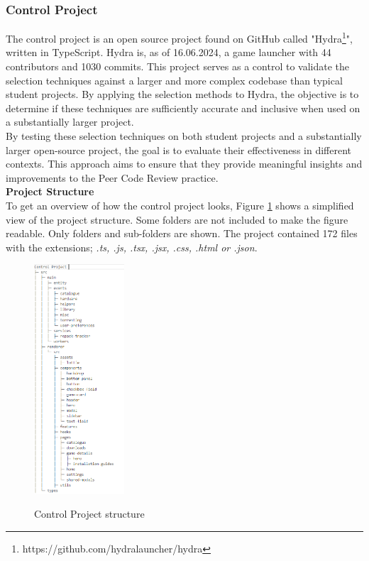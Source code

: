 \subsubsection{Control Project}
The control project is an open source project found on GitHub called "Hydra\footnote{https://github.com/hydralauncher/hydra}", written in TypeScript. Hydra is, as of 16.06.2024, a game launcher with 44 contributors and 1030 commits. This project serves as a control to validate the selection techniques against a larger and more complex codebase than typical student projects. By applying the selection methods to Hydra, the objective is to determine if these techniques are sufficiently accurate and inclusive when used on a substantially larger project. \\

By testing these selection techniques on both student projects and a substantially larger open-source project, the goal is to evaluate their effectiveness in different contexts. This approach aims to ensure that they provide meaningful insights and improvements to the Peer Code Review practice. \\

\noindent \textbf{Project Structure} \\
\noindent To get an overview of how the control project looks, Figure \ref{fig:Control_Structure} shows a simplified view of the project structure. Some folders are not included to make the figure readable. Only folders and sub-folders are shown. The project contained 172 files with the extensions; \textit{.ts, .js, .tsx, .jsx, .css, .html or .json}.


\begin{figure}[H]
    \centering
    \caption{Control Project structure} \includegraphics[width=0.3\textwidth]{Figures/Control_Structure.png}
    \label{fig:Control_Structure}
\end{figure}



